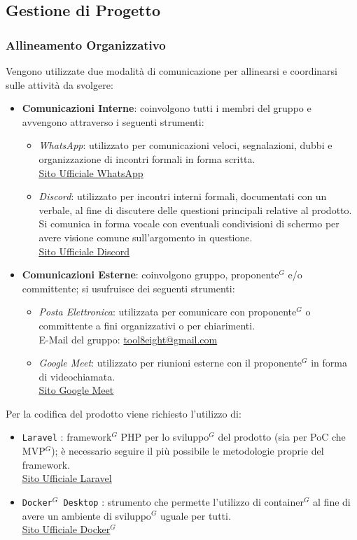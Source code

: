\documentclass[a4paper,10pt]{article}
\begin{document}
\subsection{Gestione di Progetto}
\subsubsection{Allineamento Organizzativo}
Vengono utilizzate due modalità di comunicazione per allinearsi e coordinarsi sulle attività da svolgere:
  \begin{itemize}
    \item \textbf{Comunicazioni Interne}: coinvolgono tutti i membri del gruppo e avvengono attraverso i seguenti strumenti:
    \begin{itemize}
      \item \textit{WhatsApp}: utilizzato per comunicazioni veloci, segnalazioni, dubbi e organizzazione di incontri formali
      in forma scritta.\\
      \href{https://www.whatsapp.com/}{\underline{Sito Ufficiale WhatsApp}}
      \item \textit{Discord}: utilizzato per incontri interni formali, documentati con un verbale, al fine di discutere delle questioni
      principali relative al prodotto. Si comunica in forma vocale con eventuali condivisioni di schermo per avere visione 
      comune sull'argomento in questione.\\ 
      \href{https://discord.com/}{\underline{Sito Ufficiale Discord}}
    \end{itemize} 
    \item \textbf{Comunicazioni Esterne}: coinvolgono gruppo, proponente$^G$ e/o committente; si usufruisce dei seguenti strumenti:
    \begin{itemize}
      \item \textit{Posta Elettronica}: utilizzata per comunicare con proponente$^G$ o committente a fini organizzativi o per chiarimenti.\\
      E-Mail del gruppo: \url{tool8eight@gmail.com} 
      \item \textit{Google Meet}: utilizzato per riunioni esterne con il proponente$^G$ in forma di videochiamata.\\
      \href{https://meet.google.com/}{\underline{Sito Google Meet}} 
    \end{itemize} 
  \end{itemize}
Per la codifica del prodotto viene richiesto l'utilizzo di:
\begin{itemize}
  \item \texttt{Laravel} : framework$^G$ PHP per lo sviluppo$^G$ del prodotto (sia per PoC che MVP$^G$); è necessario
    seguire il più possibile le metodologie proprie del framework.\\
    \href{https://laravel.com/}{\underline{Sito Ufficiale Laravel}}
  \item \texttt{Docker$^G$ Desktop} : strumento che permette l'utilizzo di container$^G$ al fine di avere un ambiente di sviluppo$^G$
    uguale per tutti.\\
    \href{https://docker.com/}{\underline{Sito Ufficiale Docker$^G$}}  
\end{itemize}
\end{document}
